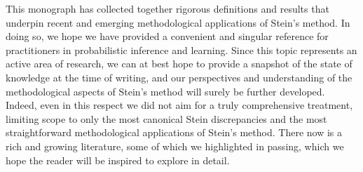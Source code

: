 \documentclass[12pt,paper=letter]{scrreprt}
\begin{document}
This monograph has collected together rigorous definitions and results that underpin recent and emerging methodological applications of Stein's method.
In doing so, we hope we have provided a convenient and singular reference for practitioners in probabilistic inference and learning.
Since this topic represents an active area of research, we can at best hope to provide a snapshot of the state of knowledge at the time of writing, and our perspectives and understanding of the methodological aspects of Stein's method will surely be further developed.
Indeed, even in this respect we did not aim for a truly comprehensive treatment, limiting scope to only the most canonical Stein discrepancies and the most straightforward methodological applications of Stein's method.
There now is a rich and growing literature, some of which we highlighted in passing, which we hope the reader will be inspired to explore in detail.






\end{document}
